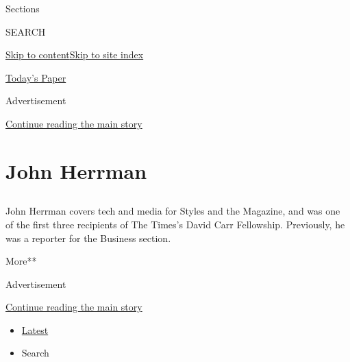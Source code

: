 Sections

SEARCH

\protect\hyperlink{site-content}{Skip to
content}\protect\hyperlink{site-index}{Skip to site index}

\href{https://myaccount.nytimes3xbfgragh.onion/auth/login?response_type=cookie\&client_id=vi}{}

\href{https://www.nytimes3xbfgragh.onion/section/todayspaper}{Today's
Paper}

Advertisement

\protect\hyperlink{after-top}{Continue reading the main story}

\hypertarget{john-herrman}{%
\section{John Herrman}\label{john-herrman}}

\subsection{}

John Herrman covers tech and media for Styles and the Magazine, and was
one of the first three recipients of The Times's David Carr Fellowship.
Previously, he was a reporter for the Business section.

More**

Advertisement

\protect\hyperlink{after-mid1}{Continue reading the main story}

\begin{itemize}
\tightlist
\item
  \protect\hyperlink{stream-panel}{Latest}
\item
  Search
\end{itemize}

